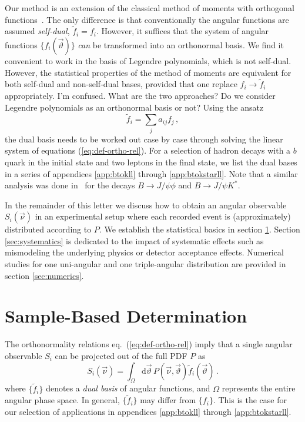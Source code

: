 \documentclass[aps,nofootinbib,preprintnumbers,prd,twocolumn]{revtex4-1}
\newcommand{\dual}[1]{\tilde{#1}}
\newcommand{\nuvec}{\vec{\nu}}
\newcommand{\refeq}[1]{eq.~(\ref{eq:#1})}
\newcommand{\rmdx}[1]{\mbox{d} #1 \,} %
\newcommand{\thvec}{\vec{\vartheta}}
\renewcommand{\theta}{\vartheta}
\newcommand{\fred}[1]{{\color{brown!85!black}#1}}
\newcommand{\add}[1]{\textcolor{green!85!black}{#1}}
\begin{document}
Our method is an extension of the classical method of moments with
orthogonal functions~\cite[sec. 8.2]{James:2006zz}. The only difference
is that conventionally the angular functions are assumed
\emph{self-dual}, $\dual{f}_i = f_i$. However, it suffices that the
system of angular functions $\{f_i(\thvec)\}$ \emph{can} be transformed into
an orthonormal basis. \add{We find it convenient to work
in the basis of Legendre polynomials, which is not self-dual.
However, the statistical properties of the method of moments are equivalent for both self-dual and non-self-dual
bases, provided that one replace $f_i \to \dual{f}_i$ appropriately.}
\fred{I'm confused. What are the two approaches? Do we consider Legendre polynomials as an orthonormal basis or not?}
Using the ansatz
\begin{equation}
  \label{eq:dual-ansatz}
  \dual{f}_i = \sum_{j} a_{ij} f_j \,,
\end{equation}
the dual basis needs to be worked out case by case through solving the
linear system of equations (\ref{eq:def-ortho-rel}). For a selection
of hadron decays with a $b$ quark in the initial state and two leptons
in the final state, we list the dual bases in a series of appendices
\ref{app:btokll} through \ref{app:btokstarll}. Note that a
similar analysis was done in~\cite{Dighe:1998vk} for the decays $B \to
J/\psi \phi$ and $B \to J/\psi K^{*}$.

In the remainder of this letter we discuss how to obtain an angular
observable $S_i(\nuvec)$ in an experimental setup where each recorded
event is (approximately) distributed according to $P$.  We establish
the statistical basics in section \ref{sec:sample-based-det}. Section
\ref{sec:systematics} is dedicated to the impact of systematic effects
such as mismodeling the underlying physics or detector acceptance
effects. Numerical studies for one uni-angular and one triple-angular
distribution are provided in section \ref{sec:numerics}.

\section{Sample-Based Determination}
\label{sec:sample-based-det}

The orthonormality relations \refeq{def-ortho-rel} imply that a single angular observable $S_i$
can be projected out of the full PDF $P$ as
\begin{equation}
    \label{eq:det-Pi-analytical}
    S_i(\nuvec) = \int_{\Omega} \rmdx{\vec\theta}  P(\nuvec, \thvec) \dual{f}_i(\thvec)\,.
\end{equation}
where $\lbrace \dual{f}_i \rbrace$ denotes a \emph{dual basis} of angular functions, and $\Omega$ represents the entire angular phase space. In general, $\lbrace \dual{f}_i \rbrace$ may differ from $\lbrace f_i \rbrace$. This is the
case for our selection of applications in appendices \ref{app:btokll} through \ref{app:btokstarll}.\\
\end{document}
